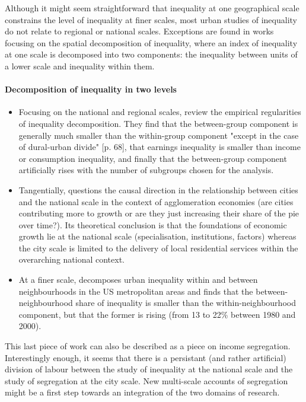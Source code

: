 \documentclass[11.5pt]{article}
\begin{document}
Although it might seem straightforward that inequality at one geographical scale constrains the level of inequality at finer scales, most urban studies of inequality do not relate to regional or national scales. Exceptions are found in works focusing on the spatial decomposition of inequality, where an index of inequality at one scale is decomposed into two components: the inequality between units of a lower scale and inequality within them.

\paragraph{Decomposition of inequality in two levels}
\begin{itemize}
\item Focusing on the national and regional scales,\cite{shorrocks_spatial_2005} review the empirical regularities of inequality decomposition. They find that the between-group component is generally much smaller than the within-group component "except in the case of dural-urban divide" [p. 68], that earnings inequality is smaller than income or consumption inequality, and finally that the between-group component artificially rises with the number of subgroups chosen for the analysis.
\item Tangentially, \cite{polese_cities_2005} questions the causal direction in the relationship between cities and the national scale in the context of agglomeration economies (are cities contributing more to growth or are they just increasing their share of the pie over time?). Its theoretical conclusion is that the foundations of economic growth lie at the national scale (specialisation, institutions, factors) whereas the city scale is limited to the delivery of local residential services within the overarching national context.
\item At a finer scale, \cite{wheeler_urban_2006} decomposes urban inequality within and between neighbourhoods in the US metropolitan areas and finds that the between-neighbourhood share of inequality is smaller than the within-neighbourhood component, but that the former is rising (from 13 to 22\% between 1980 and 2000).
\end{itemize}

This last piece of work can also be described as a piece on income segregation. Interestingly enough, it seems that there is a persistant (and rather artificial) division of labour between the study of inequality at the national scale and the study of segregation at the city scale. New multi-scale accounts of segregation might be a first step towards an integration of the two domains of research.
\end{document}
